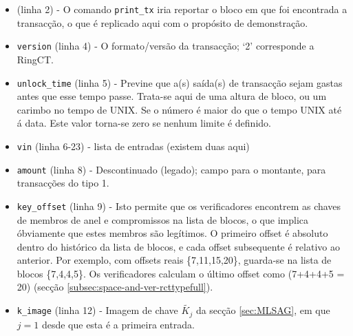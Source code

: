 \begin{itemize}
    \item (linha 2) - O comando {\tt print\_tx} iria reportar o bloco em que foi encontrada a transacção, o que é replicado aqui com o propósito de demonstração.  
	\item {\tt version} (linha 4) - O formato/versão da transacção; `2' corresponde a RingCT.
	\item {\tt unlock\_time} (linha 5) - Previne que a(s) saída(s) de transacção sejam gastas antes que esse tempo passe. Trata-se aqui de uma altura de bloco, ou um carimbo no tempo de UNIX. Se o número é maior do que o tempo UNIX até á data. Este valor torna-se zero se nenhum limite é definido.  
	\item {\tt vin} (linha 6-23) - lista de entradas (existem duas aqui)
	\item {\tt amount} (linha 8) - Descontinuado (legado); campo para o montante, para transacções do tipo 1.
	\item {\tt key\_offset} (linha 9) - Isto permite que os verificadores encontrem as chaves de membros de anel e compromissos na lista de blocos, o que implica óbviamente que estes membros são legítimos. O primeiro offset é absoluto dentro do histórico da lista de blocos, e cada offset subsequente é relativo ao anterior. Por exemplo, com offsets reais \{7,11,15,20\}, guarda-se na lista de blocos \{7,4,4,5\}. Os verificadores calculam o último offset como (7+4+4+5 = 20) (secção \ref{subsec:space-and-ver-rcttypefull}).
	\item {\tt k\_image} (linha 12) - Imagem de chave \(\tilde{K_j}\) da secção \ref{sec:MLSAG}, em que $j = 1$ desde que esta é a primeira entrada.  

\end{itemize}
